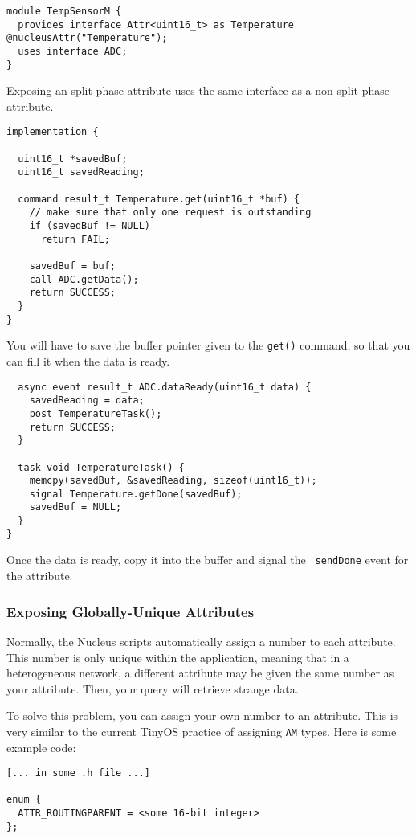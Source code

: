 \documentclass{article}
\begin{document}
\begin{verbatim}
module TempSensorM {
  provides interface Attr<uint16_t> as Temperature @nucleusAttr("Temperature");
  uses interface ADC;
}
\end{verbatim}

Exposing an split-phase attribute uses the same interface as a
non-split-phase attribute.

\begin{verbatim}
implementation {

  uint16_t *savedBuf;
  uint16_t savedReading;

  command result_t Temperature.get(uint16_t *buf) {                  
    // make sure that only one request is outstanding
    if (savedBuf != NULL)
      return FAIL;

    savedBuf = buf;
    call ADC.getData();
    return SUCCESS;
  }
}
\end{verbatim}

You will have to save the buffer pointer given to the {\tt get()}
command, so that you can fill it when the data is ready.

\begin{verbatim}
  async event result_t ADC.dataReady(uint16_t data) {
    savedReading = data;
    post TemperatureTask();
    return SUCCESS;
  }

  task void TemperatureTask() {
    memcpy(savedBuf, &savedReading, sizeof(uint16_t));
    signal Temperature.getDone(savedBuf);
    savedBuf = NULL;
  }
}
\end{verbatim}

Once the data is ready, copy it into the buffer and signal the {\tt
  sendDone} event for the attribute.

\subsubsection{Exposing Globally-Unique Attributes}

Normally, the Nucleus scripts automatically assign a number to each
attribute. This number is only unique within the application, meaning
that in a heterogeneous network, a different attribute may be given
the same number as your attribute. Then, your query will retrieve
strange data.

To solve this problem, you can assign your own number to an
attribute. This is very similar to the current TinyOS practice of
assigning {\tt AM} types. Here is some example code:

\begin{verbatim}
[... in some .h file ...]

enum {
  ATTR_ROUTINGPARENT = <some 16-bit integer>
};
\end{verbatim}
\end{document}
